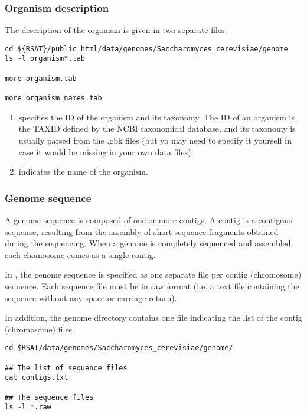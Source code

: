 \subsubsection{Organism description} 

The description of the organism is given in two separate files.


\begin{footnotesize}
\begin{verbatim}
cd ${RSAT}/public_html/data/genomes/Saccharomyces_cerevisiae/genome
ls -l organism*.tab

more organism.tab

more organism_names.tab
\end{verbatim}
\end{footnotesize}

\begin{enumerate}
\item {} specifies the ID of the organism and its
  taxonomy. The ID of an organism is the TAXID defined by the NCBI
  taxonomical database, and its taxonomy is usually parsed from the
  .gbk files (but yo may need to specify it yourself in case it would
  be missing in your own data files).

\item {} indicates the name of the organism.
\end{enumerate}


\subsubsection{Genome sequence} 

A genome sequence is composed of one or more contigs. A contig is a
contigous sequence, resulting from the assembly of short sequence
fragments obtained during the sequencing. When a genome is completely
sequenced and assembled, each chomosome comes as a single contig. 

In \RSAT, the genome sequence is specified as one separate file per
contig (chromosome) sequence. Each sequence file must be in raw format
(i.e. a text file containing the sequence without any space or
carriage return). 

In addition, the genome directory contains one file indicating the
list of the contig (chromosome) files.

\begin{footnotesize}
\begin{verbatim}
cd $RSAT/data/genomes/Saccharomyces_cerevisiae/genome/

## The list of sequence files
cat contigs.txt

## The sequence files
ls -l *.raw

\end{verbatim}
\end{footnotesize}


